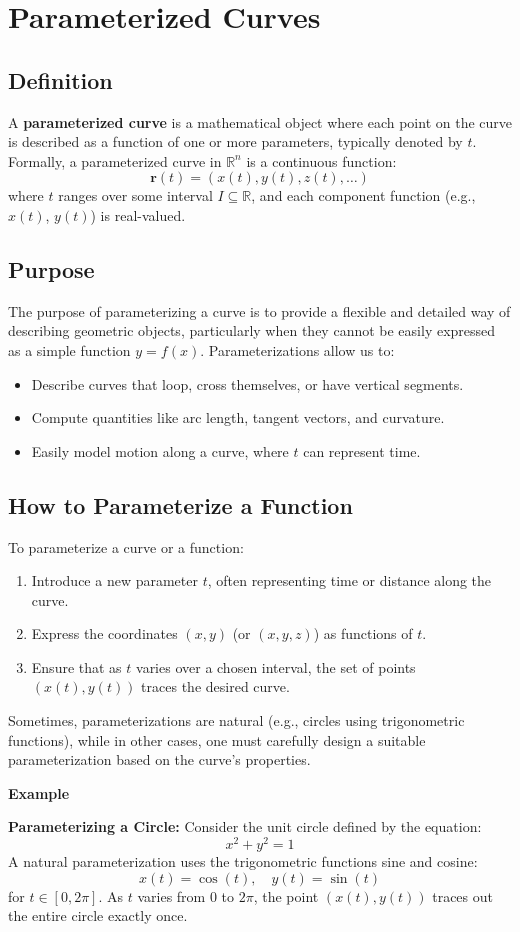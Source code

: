 \section{Parameterized Curves}

\subsection{Definition}
A \textbf{parameterized curve} is a mathematical object where each point on the curve is described as a function of one or more parameters, typically denoted by \( t \). Formally, a parameterized curve in \( \mathbb{R}^n \) is a continuous function:
\[
\mathbf{r}(t) = (x(t), y(t), z(t), \ldots)
\]
where \( t \) ranges over some interval \( I \subseteq \mathbb{R} \), and each component function (e.g., \( x(t) \), \( y(t) \)) is real-valued.

\subsection{Purpose}
The purpose of parameterizing a curve is to provide a flexible and detailed way of describing geometric objects, particularly when they cannot be easily expressed as a simple function \( y = f(x) \). Parameterizations allow us to:
\begin{itemize}[label=\(-\)]
    \item Describe curves that loop, cross themselves, or have vertical segments.
    \item Compute quantities like arc length, tangent vectors, and curvature.
    \item Easily model motion along a curve, where \( t \) can represent time.
\end{itemize}

\subsection{How to Parameterize a Function}
To parameterize a curve or a function:
\begin{enumerate}
    \item Introduce a new parameter \( t \), often representing time or distance along the curve.
    \item Express the coordinates \( (x, y) \) (or \( (x, y, z) \)) as functions of \( t \).
    \item Ensure that as \( t \) varies over a chosen interval, the set of points \( (x(t), y(t)) \) traces the desired curve.
\end{enumerate}
Sometimes, parameterizations are natural (e.g., circles using trigonometric functions), while in other cases, one must carefully design a suitable parameterization based on the curve's properties.

\textbf{Example}

\textbf{Parameterizing a Circle:}  
Consider the unit circle defined by the equation:
\[
x^2 + y^2 = 1
\]
A natural parameterization uses the trigonometric functions sine and cosine:
\[
x(t) = \cos(t), \quad y(t) = \sin(t)
\]
for \( t \in [0, 2\pi] \).  
As \( t \) varies from \( 0 \) to \( 2\pi \), the point \( (x(t), y(t)) \) traces out the entire circle exactly once.

\newpage
